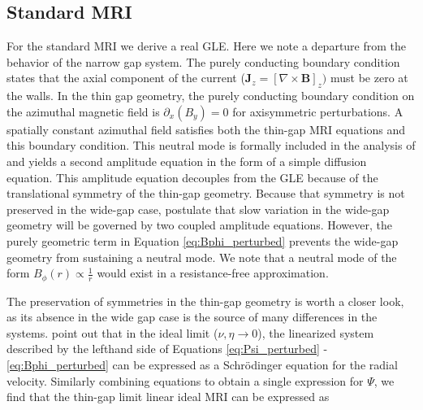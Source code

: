 \documentclass{emulateapj}
\newcommand{\citei}[1]{\citeauthor{#1} \citeyear{#1}}
\begin{document}

\subsection{Standard MRI}

For the standard MRI we derive a real GLE. Here we note a departure from the behavior of the narrow gap system. The purely conducting boundary condition states that the axial component of the current ($\mathbf{J}_z = [\nabla \times \mathbf{B}]_z)$ must be zero at the walls. In the thin gap geometry, the purely conducting boundary condition on the azimuthal magnetic field is $\partial_x(B_y) = 0$ for axisymmetric perturbations. A spatially constant azimuthal field satisfies both the thin-gap MRI equations and this boundary condition. This neutral mode is formally included in the analysis of \citei{Umurhan:2007hs} and yields a second amplitude equation in the form of a simple diffusion equation. This amplitude equation decouples from the GLE because of the translational symmetry of the thin-gap geometry. Because that symmetry is not preserved in the wide-gap case, \citeauthor{Umurhan:2007hs} postulate that slow variation in the wide-gap geometry will be governed by two coupled amplitude equations. %
However, the purely geometric term in Equation \ref{eq:Bphi_perturbed} prevents the wide-gap geometry from sustaining a neutral mode. We note that a neutral mode of the form $B_\phi(r) \propto \frac{1}{r}$ would exist in a resistance-free approximation.

The preservation of symmetries in the thin-gap geometry is worth a closer look, as its absence in the wide gap case is the source of many differences in the systems. \citei{Latter:2015} point out that in the ideal limit ($\nu, \eta \rightarrow 0$), the linearized system described by the lefthand side of Equations \ref{eq:Psi_perturbed} - \ref{eq:Bphi_perturbed} can be expressed as a Schr{\"o}dinger equation for the radial velocity. Similarly combining equations to obtain a single expression for $\Psi$, we find that the thin-gap limit linear ideal MRI can be expressed as
\end{document}
